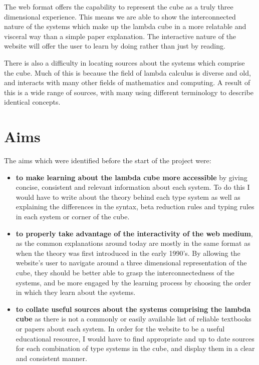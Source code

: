 \documentclass{l4proj}
\begin{document}
The web format offers the capability to represent the cube as a truly three dimensional experience. This means we are able to show the interconnected nature of the systems which make up the lambda cube in a more relatable and visceral way than a simple paper explanation.  The interactive nature of the website will offer the user to learn by doing rather than just by reading.

There is also a difficulty in locating sources about the systems which comprise the cube.  Much of this is because the field of lambda calculus is diverse and old, and interacts with many other fields of mathematics and computing.  A result of this is a wide range of sources, with many using different terminology to describe identical concepts.



\section{Aims}

The aims which were identified before the start of the project were: 
\begin{itemize}
    \item
    \textbf{to make learning about the lambda cube more accessible} by giving concise, consistent and relevant information about each system.  To do this I would have to write about the theory behind each type system as well as explaining the differences in the syntax, beta reduction rules and typing rules in each system or corner of the cube.

    \item
    \textbf{to properly take advantage of the interactivity of the web medium}, as the common explanations around today are mostly in the same format as when the theory was first introduced in the early 1990's.  By allowing the website's user to navigate around a three dimensional representation of the cube, they should be better able to grasp the interconnectedness of the systems, and be more engaged by the learning process by choosing the order in which they learn about the systems.

    \item
    \textbf{to collate useful sources about the systems comprising the lambda cube} as there is not a commonly or easily available list of reliable textbooks or papers about each system.  In order for the website to be a useful educational resource, I would have to find appropriate and up to date sources for each combination of type systems in the cube, and display them in a clear and consistent manner.
\end{itemize}
\end{document}
